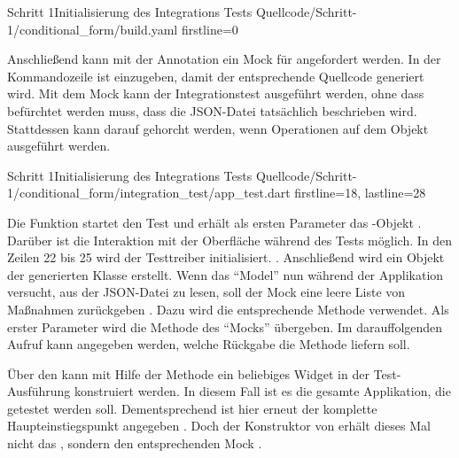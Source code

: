 \begin{alexyamllisting}{Schritt 1}{Initialisierung des Integrations Tests}
  {Quellcode/Schritt-1/conditional_form/build.yaml}
  {firstline=0}
  \label{lst:Schritt1IntegrationsTestInitialisierung}
\end{alexyamllisting}

Anschließend kann mit der Annotation   ein Mock für  angefordert werden.
In der Kommandozeile ist  einzugeben, damit der entsprechende Quellcode generiert wird.
Mit dem Mock kann der Integrationstest ausgeführt werden, ohne dass befürchtet werden muss, dass die JSON-Datei tatsächlich beschrieben wird.
Stattdessen kann darauf gehorcht werden, wenn Operationen auf dem Objekt ausgeführt werden. 

\begin{alexlisting}{Schritt 1}{Initialisierung des Integrations Tests}
  {Quellcode/Schritt-1/conditional_form/integration_test/app_test.dart}
  {firstline=18, lastline=28}
  \label{lst:Schritt1IntegrationsTestInitialisierung}
\end{alexlisting}

Die Funktion  startet den Test und erhält als ersten Parameter das -Objekt .
Darüber ist die Interaktion mit der Oberfläche während des Tests möglich.
In den Zeilen 22 bis 25 wird der Testtreiber initialisiert. . Anschließend wird ein Objekt der generierten Klasse  erstellt. Wenn das \enquote{Model} nun während der Applikation versucht, aus der JSON-Datei zu lesen, soll der Mock eine leere Liste von Maßnahmen zurückgeben . Dazu wird die entsprechende Methode  verwendet. Als erster Parameter wird die Methode  des \enquote{Mocks} übergeben. Im darauffolgenden Aufruf  kann angegeben werden, welche Rückgabe die Methode liefern soll.

Über den  kann mit Hilfe der Methode  ein beliebiges Widget in der Test-Ausführung konstruiert werden.
In diesem Fall ist es die gesamte Applikation, die getestet werden soll.
Dementsprechend ist  hier erneut der komplette Haupteinstiegspunkt angegeben \Lst{\ref{lst:Schritt1IntegrationsTestWidgetInitialisierung}}.
Doch der Konstruktor von  erhält dieses Mal nicht das , sondern den entsprechenden Mock . 

